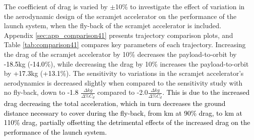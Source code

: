 The coefficient of drag is varied by $\pm$10\% to investigate the effect of variation in the aerodynamic design of the scramjet accelerator on the performance of the launch system, when the fly-back of the scramjet accelerator is included. Appendix \ref{sec:app_comparison41} presents trajectory comparison plots, and Table \ref{tab:comparison41} compares key parameters of each trajectory. 
Increasing the drag of the scramjet accelerator by 10\% decreases the payload-to-orbit by \textcolor{black}{-18.5}kg (\textcolor{black}{-14.0}\%), while decreasing the drag by 10\% increases the payload-to-orbit by \textcolor{black}{+17.3}kg (\textcolor{black}{+13.1}\%). 
The sensitivity to variations in the scramjet accelerator's aerodynamics is decreased slightly when compared to the sensitivity study with no fly-back, down to \textcolor{black}{-1.8} $\frac{\Delta kg}{\Delta\% C_{d}}$ compared to -2.0$\frac{\Delta kg}{\Delta\% C_{d}}$.
\textcolor{black}{This is due to the increased drag decreasing the total acceleration, which in turn decreases the ground distance necessary to cover during the fly-back, from \returnDistCdNinety km at 90\% drag, to \returnDistCdOneHundredTen km at 110\% drag, partially offsetting the detrimental effects of the increased drag on the performance of the launch system. }

